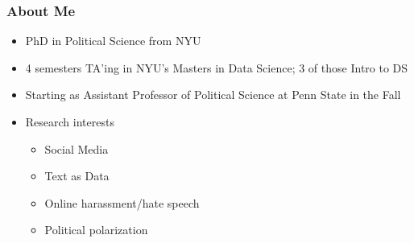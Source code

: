 \documentclass{beamer}
\begin{document}
\begin{frame}
	\frametitle{About Me}
	\begin{itemize}
		
		\item PhD in Political Science from NYU
		\pause
		\vspace{1em}
		\item 4 semesters TA'ing in NYU's Masters in Data Science; 3 of those Intro to DS
		\pause
		\vspace{1em}
		\item Starting as Assistant Professor of Political Science at Penn State in the Fall
		\pause
		\vspace{1em}
		\item Research interests
		
		\pause
\begin{itemize}
	\item Social Media
	\pause 
	\item Text as Data
	\pause 
	\item Online harassment/hate speech
	\pause
	\item Political polarization
\end{itemize}

		
	\end{itemize}
\end{frame}
	
	
\end{document}
